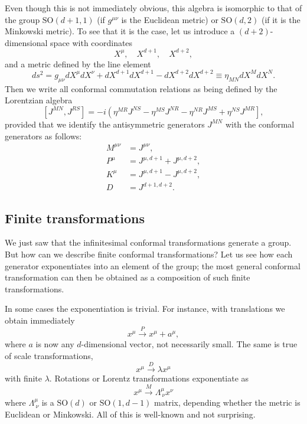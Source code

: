 \documentclass[a4paper,12pt]{article}
\newcommand{\SO}{\text{SO}}
\numberwithin{equation}{section}
\begin{document}
Even though this is not immediately obvious, this algebra is isomorphic to that of the group $\SO(d+1, 1)$ (if $g^{\mu\nu}$ is the Euclidean metric) or $\SO(d, 2)$ (if it is the Minkowski metric).
To see that it is the case, let us introduce a $(d + 2)$-dimensional space with coordinates
\begin{equation}
	X^\mu, \quad X^{d+1}, \quad X^{d+2},
\end{equation}
and a metric defined by the line element
\begin{equation}
	ds^2 = g_{\mu\nu} dX^\mu dX^\nu + dX^{d+1} dX^{d+1}
	- dX^{d+2} dX^{d+2}
	\equiv \eta_{MN} dX^M dX^N.
\end{equation}
Then we write all conformal commutation relations as being defined by the Lorentzian algebra
\begin{equation}
	\left[ J^{MN}, J^{RS} \right]
	= -i \left( \eta^{MR} J^{NS} - \eta^{MS} J^{NR}
	- \eta^{NR} J^{MS} + \eta^{NS} J^{MR} \right],
\end{equation}
provided that we identify the antisymmetric generators $J^{MN}$ with the conformal generators as follows:
\begin{equation}
\begin{aligned}
	M^{\mu\nu} &= J^{\mu\nu},
	\\
	P^\mu &= J^{\mu, d+1} + J^{\mu, d+2},
	\\
	K^\mu &= J^{\mu, d+1} - J^{\mu, d+2},
	\\
	D &= J^{d+1, d+2}.
\end{aligned}
\label{eq:embeddingspacealgebra}
\end{equation}


\subsection{Finite transformations}

We just saw that the infinitesimal conformal transformations generate a group. But how can we describe finite conformal transformations? Let us see how each generator exponentiates into an element of the group; the most general conformal transformation can then be obtained as a composition of such finite transformations.

In some cases the exponentiation is trivial. For instance, with translations we obtain immediately
\begin{equation}
	x^\mu \xrightarrow{P} x^\mu + a^\mu,
\end{equation}
where $a$ is now any $d$-dimensional vector, not necessarily small.
The same is true of scale transformations,
\begin{equation}
	x^\mu \xrightarrow{D} \lambda x^\mu
\end{equation}
with finite $\lambda$.
Rotations or Lorentz transformations exponentiate as
\begin{equation}
	x^\mu \xrightarrow{M} \Lambda^\mu_{~\nu} x^\nu
\end{equation}
where $\Lambda^\mu_{~\nu}$ is a $\SO(d)$ or $\SO(1, d-1)$ matrix, depending whether the metric is Euclidean or Minkowski.
All of this is well-known and not surprising.
\end{document}
